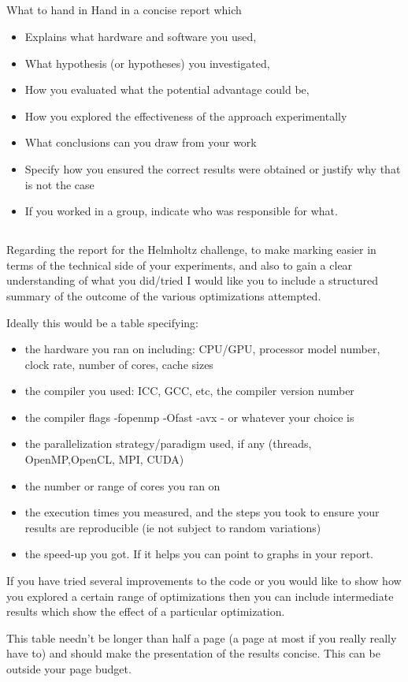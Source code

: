 \documentclass[11pt, oneside, a4paper]{article}
\begin{document}
\subsection{} %
\label{sub:}


What to hand in Hand in a concise report which
\begin{itemize}
\item  Explains what hardware and software you used,
\item  What hypothesis (or hypotheses) you investigated,
\item  How you evaluated what the potential advantage could be,
\item  How you explored the effectiveness of the approach experimentally
\item  What conclusions can you draw from your work
\item  Specify how you ensured the correct results were obtained or justify why that is not the case
\item  If you worked in a group, indicate who was responsible for what.
\end{itemize}

\subsection{} %
\label{sub:}


Regarding the report for the Helmholtz challenge, to make marking easier in terms of the technical side of your experiments, and also to gain a clear understanding of what you did/tried I would like you to include a structured summary of the outcome of the various optimizations attempted.

Ideally this would be a table specifying:
\begin{itemize}
\item  the hardware you ran on including: CPU/GPU, processor model number, clock rate, number of cores, cache sizes
\item  the compiler you used: ICC, GCC, etc, the compiler version number
\item  the compiler flags -fopenmp -Ofast -avx  - or whatever your choice is
\item  the parallelization strategy/paradigm used, if any (threads, OpenMP,OpenCL, MPI, CUDA)
\item  the number or range of cores you ran on
\item  the execution times you measured, and the steps you took to ensure your results are reproducible (ie not subject to random variations)
\item  the speed-up you got. If it helps you can point to graphs in your report.
\end{itemize}
If you have tried several improvements to the code or you would like to show how you explored a certain range of optimizations then you can include intermediate results which show the effect of a particular optimization.

This table needn't be longer than half a page (a page at most if you really really have to) and should make the presentation of the results concise.  This can be outside your page budget.

\end{document}
